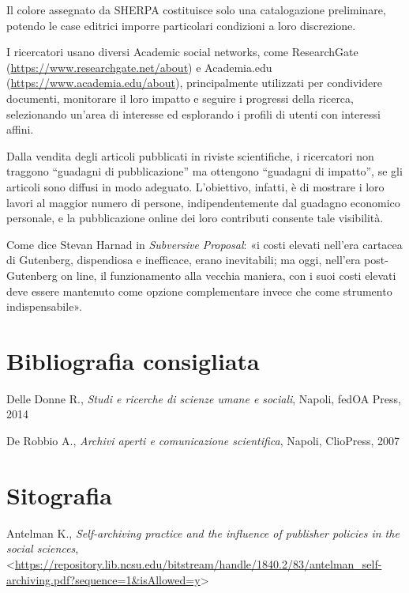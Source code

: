 \documentclass[
  b5paper,
  twoside,
  11pt,
  chapterprefix=false,
  bibliography=totocnumbered,
  parskip=0]{scrbook}
\begin{document}
Il colore assegnato da SHERPA costituisce solo una catalogazione
preliminare, potendo le case editrici imporre particolari condizioni a
loro discrezione.

I ricercatori usano diversi Academic social networks, come ResearchGate
(\href{https://www.researchgate.net/about}{{https://www.researchgate.net/about}})
e Academia.edu
(\href{https://www.academia.edu/about}{{https://www.academia.edu/about}}),
principalmente utilizzati per condividere documenti, monitorare il loro
impatto e seguire i progressi della ricerca, selezionando un'area di
interesse ed esplorando i profili di utenti con interessi affini.

Dalla vendita degli articoli pubblicati in riviste scientifiche, i
ricercatori non traggono \enquote{guadagni di pubblicazione} ma ottengono
\enquote{guadagni di impatto}, se gli articoli sono diffusi in modo adeguato.
L'obiettivo, infatti, è di mostrare i loro lavori al maggior numero di
persone, indipendentemente dal guadagno economico personale, e la
pubblicazione online dei loro contributi consente tale visibilità.

Come dice Stevan Harnad in \emph{Subversive} \emph{Proposal}: «i costi elevati
nell'era cartacea di Gutenberg, dispendiosa e inefficace, erano
inevitabili; ma oggi, nell'era post-Gutenberg on line, il funzionamento
alla vecchia maniera, con i suoi costi elevati deve essere mantenuto
come opzione complementare invece che come strumento indispensabile».

\hypertarget{bibliografia-consigliata-22}{%
\section*{Bibliografia consigliata}\label{bibliografia-consigliata-22}}

Delle Donne R., \emph{Studi e ricerche di scienze umane e sociali}, Napoli,
fedOA Press, 2014

De Robbio A., \emph{Archivi aperti e comunicazione scientifica}, Napoli,
ClioPress, 2007

\hypertarget{sitografia-28}{%
\section*{Sitografia}\label{sitografia-28}}

Antelman K., \emph{Self-archiving practice and the influence of publisher
policies in the social sciences},
\textless{}\href{https://repository.lib.ncsu.edu/bitstream/handle/1840.2/83/antelman_self-archiving.pdf?sequence=1\&isAllowed=y}{{https://repository.lib.ncsu.edu/bitstream/handle/1840.2/83/antelman\_self-archiving.pdf?sequence=1\&isAllowed=y}}\textgreater{}
\end{document}
